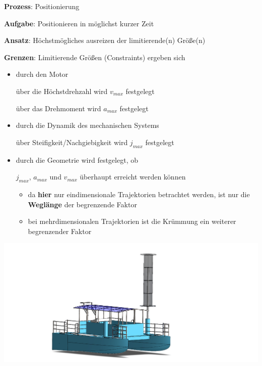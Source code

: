 {
{ 

  \textbf{Prozess}: Positionierung

  \textbf{Aufgabe}: Positionieren in möglichst kurzer Zeit

  \textbf{Ansatz}: Höchstmögliches ausreizen der limitierende(n) Größe(n)

  \textbf{Grenzen}: Limitierende Größen (Constraints) ergeben sich

  \begin{itemize}
    \item durch den Motor
          
          über die Höchstdrehzahl wird $v_{max}$ festgelegt
          
          über das Drehmoment wird $a_{max}$ festgelegt
    \item durch die Dynamik des mechanischen Systems
          
          über Steifigkeit/Nachgiebigkeit wird $j_{max}$ festgelegt
    \item durch die Geometrie wird festgelegt, ob
          
          $j_{max}$, $a_{max}$ und $v_{max}$ überhaupt erreicht werden können
      \begin{itemize}
        \item da \textbf{hier} nur eindimensionale Trajektorien betrachtet werden, ist nur die \textbf{Weglänge} der begrenzende Faktor
        \item bei mehrdimensionalen Trajektorien ist die Krümmung ein weiterer begrenzender Faktor
      \end{itemize}
  \end{itemize}
}

{
  \begin{center}
    \includegraphics[width=\textwidth]{images/WaterTaxi}
  \end{center}	
}

}
